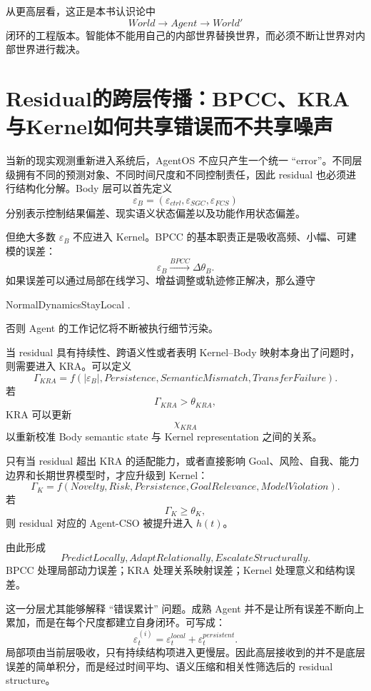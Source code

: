 从更高层看，这正是本书认识论中
\[
World
\rightarrow
Agent
\rightarrow
World'
\]
闭环的工程版本。智能体不能用自己的内部世界替换世界，而必须不断让世界对内部世界进行裁决。


\section{Residual的跨层传播：BPCC、KRA与Kernel如何共享错误而不共享噪声}

当新的现实观测重新进入系统后，AgentOS 不应只产生一个统一 ``error''。不同层级拥有不同的预测对象、不同时间尺度和不同控制责任，因此 residual 也必须进行结构化分解。Body 层可以首先定义
\[
\boxed{
\varepsilon_B
=
\left(
\varepsilon_{ctrl},
\varepsilon_{SGC},
\varepsilon_{FCS}
\right)
}
\]
分别表示控制结果偏差、现实语义状态偏差以及功能作用状态偏差。

但绝大多数 $\varepsilon_B$ 不应进入 Kernel。BPCC 的基本职责正是吸收高频、小幅、可建模的误差：
\[
\varepsilon_B
\xrightarrow{BPCC}
\Delta\theta_B .
\]
如果误差可以通过局部在线学习、增益调整或轨迹修正解决，那么遵守
\begin{statementbox}
NormalDynamicsStayLocal .
\end{statementbox}
否则 Agent 的工作记忆将不断被执行细节污染。

当 residual 具有持续性、跨语义性或者表明 Kernel--Body 映射本身出了问题时，则需要进入 KRA。可以定义
\[
\Gamma_{KRA}
=
f
\left(
|\varepsilon_B|,
Persistence,
SemanticMismatch,
TransferFailure
\right).
\]
若
\[
\Gamma_{KRA}>\theta_{KRA},
\]
KRA 可以更新
\[
\chi_{KRA}
\]
以重新校准 Body semantic state 与 Kernel representation 之间的关系。

只有当 residual 超出 KRA 的适配能力，或者直接影响 Goal、风险、自我、能力边界和长期世界模型时，才应升级到 Kernel：
\[
\Gamma_K
=
f
\left(
Novelty,
Risk,
Persistence,
GoalRelevance,
ModelViolation
\right).
\]
若
\[
\Gamma_K\geq\theta_K,
\]
则 residual 对应的 Agent-CSO 被提升进入 $h(t)$。

由此形成
\[
\boxed{
PredictLocally,
AdaptRelationally,
EscalateStructurally .
}
\]
BPCC 处理局部动力误差；KRA 处理关系映射误差；Kernel 处理意义和结构误差。

这一分层尤其能够解释 ``错误累计'' 问题。成熟 Agent 并不是让所有误差不断向上累加，而是在每个尺度都建立自身闭环。可写成：
\[
\varepsilon^{(i)}_t
=
\varepsilon^{local}_t
+
\varepsilon^{persistent}_t .
\]
局部项由当前层吸收，只有持续结构项进入更慢层。因此高层接收到的并不是底层误差的简单积分，而是经过时间平均、语义压缩和相关性筛选后的 residual structure。

